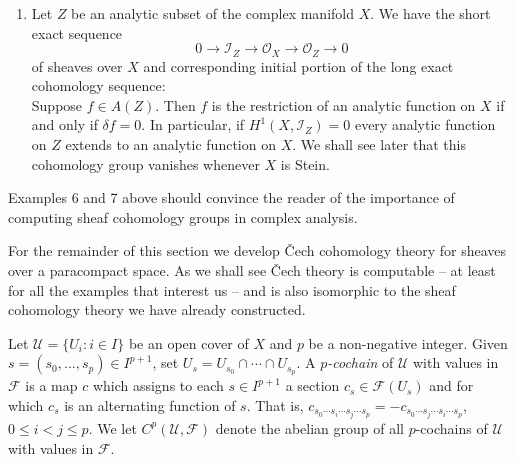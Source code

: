 \begin{enumerate}[start=3]
\[

\]
Given the data $\alpha\in H^0(X,\mathcal M/\mathcal O)$ for the Cousin I problem on $X$, we see that we can solve the Cousin I problem for $\alpha$ if and only if $\delta\alpha=0$ in $H^1(X,\mathcal O)$. In particular, $X$ will be a Cousin I domain if and only if $\operatorname{Im}\delta=0$ in $H^1(X,\mathcal O)$. Later we shall see that $H^1(X,\mathcal O)=0$ whenever $X$ is a Stein manifold and so Stein manifolds are Cousin I domains.
\item Let $Z$ be an analytic subset of the complex manifold $X$. We have the short exact sequence
\[
0\to\mathcal I_Z\to\mathcal O_X\to\mathcal O_Z\to0
\]
of sheaves over $X$ and corresponding initial portion of the long exact cohomology sequence:
\[

\]
Suppose $f\in A(Z)$. Then $f$ is the restriction of an analytic function on $X$ if and only if $\delta f=0$. In particular, if $H^1(X,\mathcal I_Z)=0$ every analytic function on $Z$ extends to an analytic function on $X$. We shall see later that this cohomology group vanishes whenever $X$ is Stein.
\end{enumerate}
Examples 6 and 7 above should convince the reader of the importance of computing sheaf cohomology groups in complex analysis.

For the remainder of this section we develop \v{C}ech cohomology theory for sheaves over a paracompact space. As we shall see \v{C}ech theory is computable -- at least for all the examples that interest us -- and is also isomorphic to the sheaf cohomology theory we have already constructed.

Let $\mathcal U=\{U_i:i\in I\}$ be an open cover of $X$ and $p$ be a non-negative integer. Given $s=(s_0,\ldots,s_p)\in I^{p+1}$, set $U_s=U_{s_0}\cap\cdots\cap U_{s_p}$. A \emph{$p$-cochain} of $\mathcal U$ with values in $\mathcal F$ is a map $c$ which assigns to each $s\in I^{p+1}$ a section $c_s\in\mathcal F(U_s)$ and for which $c_s$ is an alternating function of $s$. That is, $c_{s_0\cdots s_i\cdots s_j\cdots s_p}=-c_{s_0\cdots s_j\cdots s_i\cdots s_p}$, $0\leq i<j\leq p$. We let $C^p(\mathcal U,\mathcal F)$ denote the abelian group of all $p$-cochains of $\mathcal U$ with values in $\mathcal F$.

